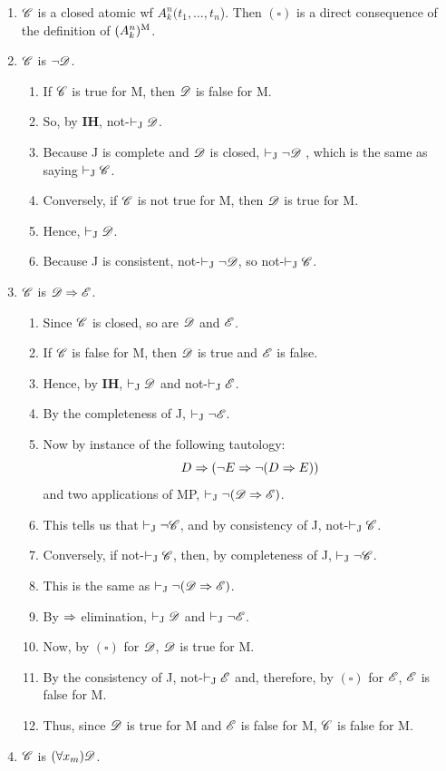 \begin{enumerate} [label = \textit{Case \arabic*.}, leftmargin=3\parindent]
    \item $\mathscr{C}$ is a closed atomic wf $A_k^n(t_1, \dots, t_n$). Then $\bm{(\square)}$ is a direct consequence of the definition of $(A_k^n)^{\text{M}}$.
    \item $\mathscr{C}$ is $\lnot \mathscr{D}$. 
    \begin{enumerate} [label = \roman*.]
        \item If $\mathscr{C}$ is true for M, then $\mathscr{D}$ is false for M.
        \item So, by \textbf{IH}, not-$\vdash_\text{J} \mathscr{D}$. 
        \item Because J is complete and $\mathscr{D}$ is closed, $\vdash_\text{J} \lnot \mathscr{D}$ , which is the same as saying $\vdash_\text{J} \mathscr{C}$.
        \item Conversely, if $\mathscr{C}$ is not true for M, then $\mathscr{D}$ is true for M.
        \item Hence, $\vdash_\text{J} \mathscr{D}$.
        \item Because J is consistent, not-$\vdash_\text{J} \lnot \mathscr{D}$, so not-$\vdash_\text{J} \mathscr{C}$.
    \end{enumerate}
    \item $\mathscr{C}$ is $\mathscr{D} \Rightarrow \mathscr{E}$.
    \begin{enumerate} [label = \roman*.]
        \item Since $\mathscr{C}$ is closed, so are $\mathscr{D}$ and $\mathscr{E}$.
        \item If $\mathscr{C}$ is false for M, then $\mathscr{D}$ is true and $\mathscr{E}$ is false. 
        \item Hence, by \textbf{IH}, $\vdash_\text{J} \mathscr{D}$ and not-$\vdash_\text{J} \mathscr{E}$.
        \item By the completeness of J, $\vdash_\text{J} \lnot \mathscr{E}$.
        \item Now by instance of the following tautology:
        \[D \Rightarrow (\lnot E \Rightarrow \lnot(D \Rightarrow E))\]
        and two applications of MP, $\vdash_\text{J} \lnot(\mathscr{D} \Rightarrow \mathscr{E})$.
        \item This tells us that $\vdash_\text{J} \lnot \mathscr{C}$, and by consistency of J, not-$\vdash_\text{J} \mathscr{C}$.
        \item Conversely, if not-$\vdash_\text{J} \mathscr{C}$, then, by completeness of J, $\vdash_\text{J} \lnot \mathscr{C}$.
        \item This is the same as $\vdash_\text{J} \lnot (\mathscr{D} \Rightarrow \mathscr{E})$.
        \item By $\Rightarrow$ elimination, $\vdash_\text{J} \mathscr{D}$ and $\vdash_\text{J} \lnot \mathscr{E}$.
        \item Now, by $\bm{(\square)}$ for $\mathscr{D}$, $\mathscr{D}$ is true for M.
        \item By the consistency of J, not-$\vdash_\text{J} \mathscr{E}$ and, therefore, by $\bm{(\square)}$ for $\mathscr{E}$, $\mathscr{E}$ is false for M.
        \item Thus, since $\mathscr{D}$ is true for M and $\mathscr{E}$ is false for M, $\mathscr{C} $ is false for M.
    \end{enumerate}
    \item $\mathscr{C}$ is $(\forall x_m) \mathscr{D}$.
\end{enumerate}
